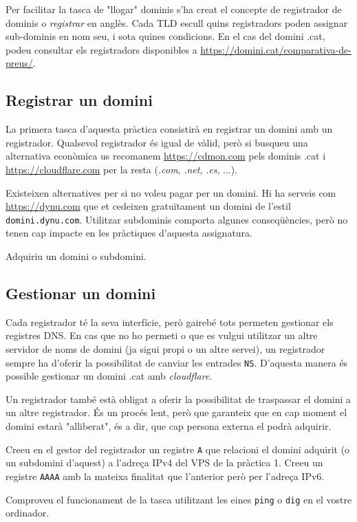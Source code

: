 \documentclass{practicaitic}
\begin{document}
Per facilitar la tasca de "llogar" dominis s'ha creat el concepte de
registrador de dominis o \textit{registrar} en anglès. Cada TLD escull quins
registradors poden assignar sub-dominis en nom seu, i sota quines condicions.
En el cas del domini .cat, podeu consultar els registradors disponibles a
\url{https://domini.cat/comparativa-de-preus/}.

\subsection{Registrar un domini}

La primera tasca d'aquesta pràctica consistirà en registrar un domini
amb un registrador. Qualsevol registrador és igual de vàlid, però si busqueu
una alternativa econòmica us recomanem \url{https://cdmon.com} pels
dominis .cat i \url{https://cloudflare.com} per la resta (\textit{.com}, \textit{.net}, \textit{.es}, ...).

Existeixen alternatives per si no voleu pagar per un domini. Hi ha serveis com
\url{https://dynu.com} que et cedeixen gratuïtament un domini de l'estil
\texttt{domini.dynu.com}. Utilitzar subdominis comporta algunes conseqüències,
però no tenen cap impacte en les pràctiques d'aquesta assignatura.

\begin{tasca}
  Adquiriu un domini o subdomini.
\end{tasca}

\subsection{Gestionar un domini}

Cada registrador té la seva interfície, però gairebé tots permeten gestionar
els registres DNS. En cas que no ho permeti o que es vulgui utilitzar un altre
servidor de noms de domini (ja sigui propi o un altre servei), un registrador
sempre ha d'oferir la possibilitat de canviar les entrades \texttt{NS}. D'aquesta
manera és possible gestionar un domini .cat amb \textit{cloudflare}.

Un registrador també està obligat a oferir la possibilitat de traspassar el domini
a un altre registrador. És un procés lent, però que garanteix que en cap moment el
domini estarà "alliberat", és a dir, que cap persona externa el podrà adquirir.

\begin{tasca}
  Creeu en el gestor del registrador un registre \texttt{A} que relacioni
  el domini adquirit (o un subdomini d'aquest) a l'adreça IPv4 del VPS de la
  pràctica 1. Creeu un registre \texttt{AAAA} amb la mateixa finalitat que l'anterior
  però per l'adreça IPv6.

  Comproveu el funcionament de la tasca utilitzant les eines \texttt{ping}
  o \texttt{dig} en el vostre ordinador.
\end{tasca}
\end{document}
